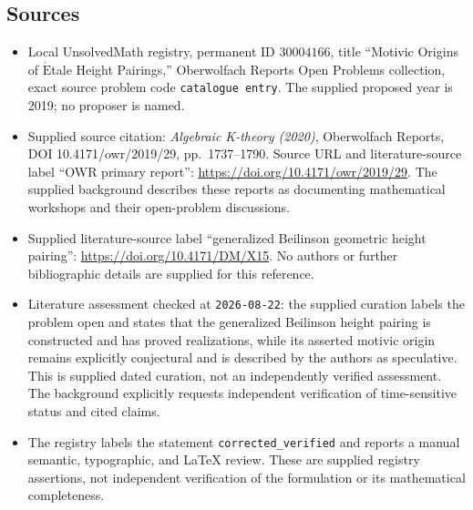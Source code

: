 \documentclass[11pt]{article}
\begin{document}
\subsection{Sources}
\begin{itemize}
\item Local UnsolvedMath registry, permanent ID \(30004166\), title ``Motivic Origins of \(\acute{\mathrm{E}}\)tale Height Pairings,'' Oberwolfach Reports Open Problems collection, exact source problem code \texttt{catalogue entry}. The supplied proposed year is 2019; no proposer is named.
\item Supplied source citation: \emph{Algebraic K-theory (2020)}, Oberwolfach Reports, DOI 10.4171/owr/2019/29, pp.\ 1737--1790. Source URL and literature-source label ``OWR primary report'': \url{https://doi.org/10.4171/owr/2019/29}. The supplied background describes these reports as documenting mathematical workshops and their open-problem discussions.
\item Supplied literature-source label ``generalized Beilinson geometric height pairing'': \url{https://doi.org/10.4171/DM/X15}. No authors or further bibliographic details are supplied for this reference.
\item Literature assessment checked at \texttt{2026-08-22}: the supplied curation labels the problem open and states that the generalized Beilinson height pairing is constructed and has proved realizations, while its asserted motivic origin remains explicitly conjectural and is described by the authors as speculative. This is supplied dated curation, not an independently verified assessment. The background explicitly requests independent verification of time-sensitive status and cited claims.
\item The registry labels the statement \texttt{corrected\_verified} and reports a manual semantic, typographic, and LaTeX review. These are supplied registry assertions, not independent verification of the formulation or its mathematical completeness.
\end{itemize}
\end{document}
